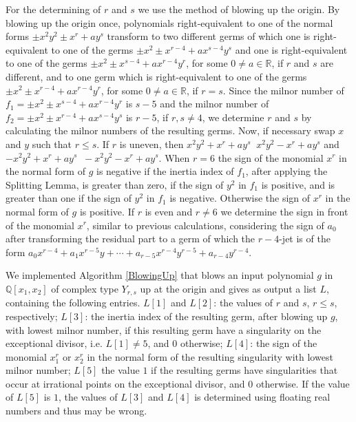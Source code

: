 \documentclass{amsproc}
\DeclareMathOperator{\requiv}{\overset{r}{\sim}}
\begin{document}
For the determining of $r$ and $s$ we use the method of blowing up the origin. By blowing up the origin once, polynomials right-equivalent to one of the normal forms $\pm x^2y^2\pm x^r+ay^s$ transform to two different germs of which one is right-equivalent to one of the germs $\pm x^2\pm x^{r-4}+ax^{s-4}y^s$ and one is right-equivalent to one of the germs  $\pm x^2\pm x^{s-4}+ax^{r-4}y^r$, for some $0\neq a\in \mathbb R$, if $r$ and $s$ are different, and to one germ which is right-equivalent to one of the germs $\pm x^2\pm x^{r-4}+ax^{r-4}y^r$, for some $0\neq a\in\mathbb R$, if  $r=s$. Since the milnor number of $f_1=\pm x^2\pm x^{s-4}+ax^{r-4}y^r$ is $s-5$ and the milnor number of $f_2=\pm x^2\pm x^{r-4}+ax^{s-4}y^s$  is $r-5$, if $r,s\neq 4$, we determine $r$ and $s$ by calculating the milnor numbers of the resulting germs. Now, if necessary swap $x$ and $y$ such that $r\le s$. If $r$ is uneven, then $x^2y^2+x^{r}+ay^s\requiv x^2y^2- x^{r}+ay^s$ and $-x^2y^2+x^{r}+ay^s\requiv -x^2y^2- x^{r}+ay^s$. When $r=6$ the sign of the monomial $x^r$ in the normal form of $g$ is negative if the inertia index of $f_1$, after applying the Splitting Lemma, is greater than zero, if the sign of $y^2$ in $f_1$ is positive, and is greater than one if the sign of $y^2$ in $f_1$ is negative. Otherwise the sign of $x^r$ in the normal form of $g$ is positive. If $r$ is even and $r\neq 6$ we determine the sign in front of the monomial $x^r$, similar to previous calculations, considering the sign of $a_0$ after transforming the residual part to a germ of which the $r-4$-jet is of the form $a_0x^{r-4}+a_1x^{r-5}y+\cdots+a_{r-5}x^{r-4}y^{r-5}+a_{r-4}y^{r-4}$.  

We implemented Algorithm \ref{BlowingUp} that blows an input polynomial $g$ in $\mathbb Q[x_1,x_2]$ of complex type $Y_{r,s}$ up at the origin and gives as output a list $L$, containing the following entries. $L[1]$ and $L[2]$: the values of $r$ and $s$, $r\le s$, respectively; $L[3]$: the inertia index of the resulting germ, after blowing up $g$, with lowest milnor number, if this resulting germ have a singularity on the exceptional divisor, i.e. $L[1]\neq 5$, and $0$ otherwise; $L[4]$: the sign of the monomial $x_1^r$ or $x_2^r$ in the normal form of the resulting singularity with lowest milnor number; $L[5]$ the value $1$ if the resulting germs have singularities that occur at irrational points on the exceptional divisor, and $0$ otherwise. If the value of $L[5]$ is $1$, the values of $L[3]$ and $L[4]$ is determined using floating real numbers and thus may be wrong. 
\end{document}
